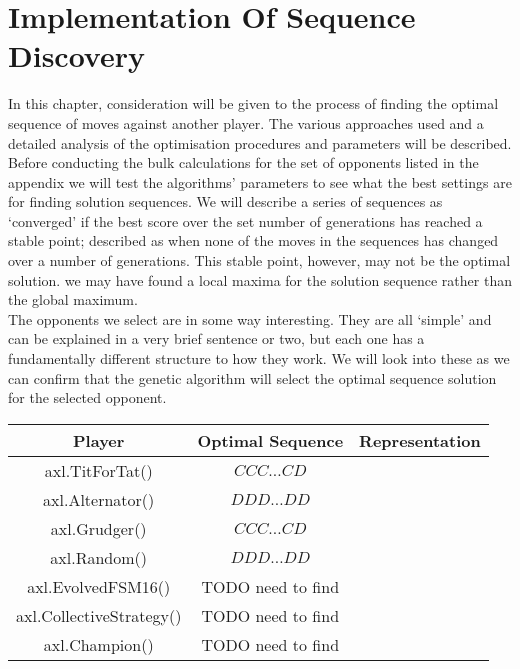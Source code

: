 \chapter{Implementation Of Sequence Discovery}\label{ch:implementation}
In this chapter, consideration will be given to the process of finding the optimal sequence of moves against another player.
The various approaches used and a detailed analysis of the optimisation procedures and parameters will be described.\\

Before conducting the bulk calculations for the set of opponents listed in the appendix we will test the algorithms' parameters to see what the best settings are for finding solution sequences.
We will describe a series of sequences as `converged' if the best score over the set number of generations has reached a stable point;
described as when none of the moves in the sequences has changed over a number of generations.
This stable point, however, may not be the optimal solution.
we may have found a local maxima for the solution sequence rather than the global maximum. \\

The opponents we select are in some way interesting.
They are all `simple' and can be explained in a very brief sentence or two, but each one has a fundamentally different structure to how they work.
We will look into these as we can confirm that the genetic algorithm will select the optimal sequence solution for the selected opponent. \\

\begin{table*}
    \centering
    \begin{tabular}{ccc}
        \toprule
        Player & Optimal Sequence & Representation\\
        \midrule
        axl.TitForTat()&\(CCC\ldots CD\)&\\
        axl.Alternator()&\(DDD\ldots DD\)&\\
        axl.Grudger()&\(CCC\ldots CD\)&\\
        axl.Random()&\(DDD\ldots DD\)&\\
        axl.EvolvedFSM16()&TODO need to find&\\
        axl.CollectiveStrategy()&TODO need to find&\\
        axl.Champion()&TODO need to find&\\
        \bottomrule
    \end{tabular}
\end{table*}


